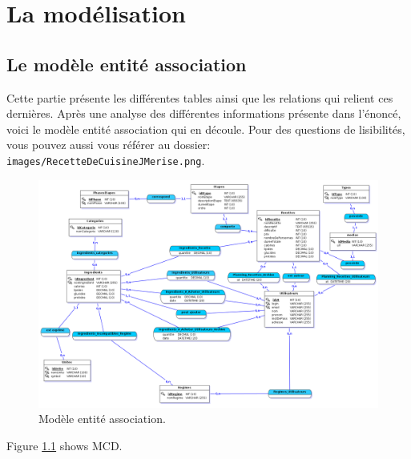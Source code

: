 \chapter{La modélisation}

\section{Le modèle entité association}
Cette partie présente les différentes tables ainsi que les relations
qui relient ces dernières. Après une analyse des différentes informations présente dans l'énoncé, voici le modèle entité association qui en découle. Pour des questions de lisibilités, vous pouvez aussi vous référer au dossier:
\newline 
\texttt{images/RecetteDeCuisineJMerise.png}.

\begin{figure}
    \includegraphics[scale=0.3]{images/RecetteDeCuisineJMerise.png}
    \caption{Modèle entité association.}
    \label{fig:modele E/A}
\end{figure}
Figure \ref{fig:modele E/A} shows MCD.

